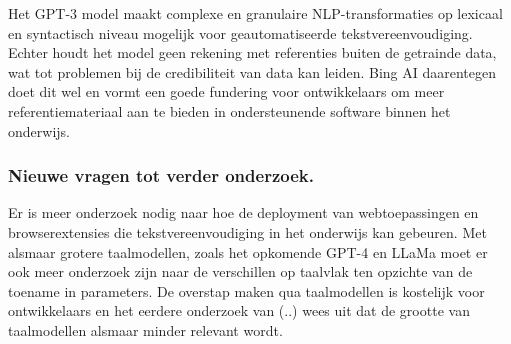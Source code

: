 Het GPT-3 model maakt complexe en granulaire NLP-transformaties op lexicaal en syntactisch niveau mogelijk voor geautomatiseerde tekstvereenvoudiging. Echter houdt het model geen rekening met referenties buiten de getrainde data, wat tot problemen bij de credibiliteit van data kan leiden. Bing AI daarentegen doet dit wel en vormt een goede fundering voor ontwikkelaars om meer referentiemateriaal aan te bieden in ondersteunende software binnen het onderwijs.


\subsubsection{Nieuwe vragen tot verder onderzoek.}

Er is meer onderzoek nodig naar hoe de deployment van webtoepassingen en browserextensies die tekstvereenvoudiging in het onderwijs kan gebeuren. Met alsmaar grotere taalmodellen, zoals het opkomende GPT-4 en LLaMa moet er ook meer onderzoek zijn naar de verschillen op taalvlak ten opzichte van de toename in parameters. De overstap maken qua taalmodellen is kostelijk voor ontwikkelaars en het eerdere onderzoek van (..) wees uit dat de grootte van taalmodellen alsmaar minder relevant wordt.